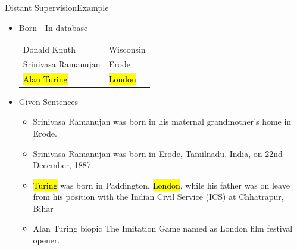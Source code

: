 \documentclass{beamer}
\makeatletter
\newcommand\SoulColor{%
  \let\set@color\beamerorig@set@color
  \let\reset@color\beamerorig@reset@color}
\makeatother
\begin{document}
\begin{frame}{Distant Supervision}{Example}
\begin{itemize}
 
\item Born - In database
 \begin{center}
\begin{tabular}{|l|l|}
\hline
Donald Knuth & Wisconsin \\
Srinivasa Ramanujan & Erode \\
\SoulColor\hl{Alan Turing} & \SoulColor\hl{London} \\
\hline
\end{tabular}
\end{center}
\item Given Sentences
\begin{itemize}
\item Srinivasa Ramanujan was born in his maternal grandmother’s home in Erode.
\item Srinivasa Ramanujan was born in Erode, Tamilnadu, India, on 22nd December, 1887.
\item \alert<+> {\SoulColor\hl{Turing} was born in Paddington, \SoulColor\hl{London}, while his father was on leave from his position with the Indian Civil Service (ICS) at Chhatrapur, Bihar}
\item Alan Turing biopic The Imitation Game named as London film festival opener.
\end{itemize}
\end{itemize}
 
\end{frame}
\end{document}
